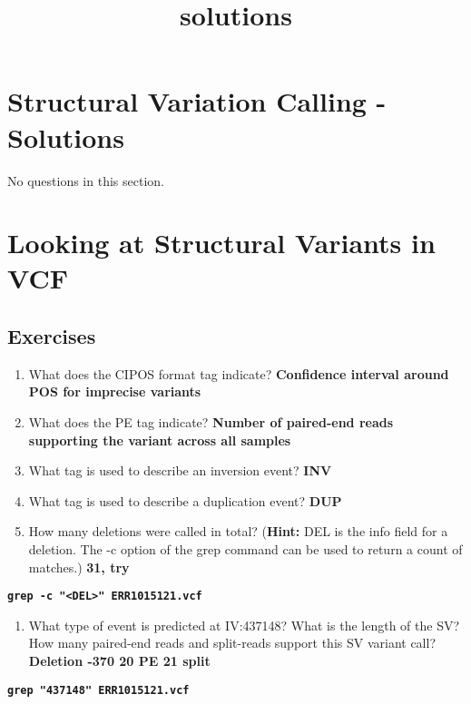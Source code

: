 \documentclass[11pt]{article}
\title{solutions}
\providecommand{\tightlist}{%
      \setlength{\itemsep}{0pt}\setlength{\parskip}{0pt}}
\begin{document}
    \hypertarget{structural-variation-calling---solutions}{%
\section{Structural Variation Calling -
Solutions}\label{structural-variation-calling---solutions}}

No questions in this section.

    \hypertarget{looking-at-structural-variants-in-vcf}{%
\section{Looking at Structural Variants in
VCF}\label{looking-at-structural-variants-in-vcf}}

\hypertarget{exercises}{%
\subsection{Exercises}\label{exercises}}

\begin{enumerate}
\def\labelenumi{\arabic{enumi}.}
\item
  What does the CIPOS format tag indicate? \textbf{Confidence interval
  around POS for imprecise variants}
\item
  What does the PE tag indicate? \textbf{Number of paired-end reads
  supporting the variant across all samples}
\item
  What tag is used to describe an inversion event? \textbf{INV}
\item
  What tag is used to describe a duplication event? \textbf{DUP}
\item
  How many deletions were called in total? (\textbf{Hint:} DEL is the
  info field for a deletion. The -c option of the grep command can be
  used to return a count of matches.) \textbf{31, try}
\end{enumerate}

\textbf{\texttt{grep\ -c\ "\textless{}DEL\textgreater{}"\ ERR1015121.vcf}}

\begin{enumerate}
\def\labelenumi{\arabic{enumi}.}
\setcounter{enumi}{5}
\tightlist
\item
  What type of event is predicted at IV:437148? What is the length of
  the SV? How many paired-end reads and split-reads support this SV
  variant call? \textbf{Deletion -370 20 PE 21 split}
\end{enumerate}

\textbf{\texttt{grep\ "437148"\ ERR1015121.vcf}}
\end{document}
